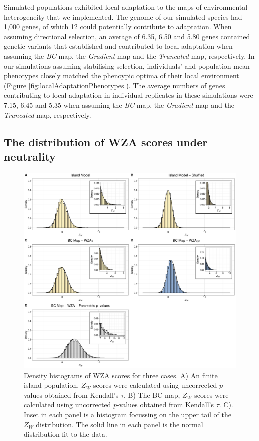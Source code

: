 \documentclass[10pt,twoside,lineno]{GSA_format}
\begin{document}
Simulated populations exhibited local adaptation to the maps of environmental heterogeneity that we implemented. The genome of our simulated species had 1,000 genes, of which 12 could potentially contribute to adaptation. When assuming directional selection, an average of 6.35, 6.50 and 5.80 genes contained genetic variants that established and contributed to local adaptation when assuming the \textit{BC} map, the \textit{Gradient} map and the \textit{Truncated} map, respectively. In our simulations assuming stabilising selection, individuals' and population mean phenotypes closely matched the phenoypic optima of their local environment (Figure \ref{fig:localAdaptationPhenotypes}). The average numbers of genes contributing to local adaptation in individual replicates in these simulations were 7.15, 6.45 and 5.35 when assuming the \textit{BC} map, the \textit{Gradient} map and the \textit{Truncated} map, respectively.\\

\subsection{The distribution of WZA scores under neutrality}

\begin{figure}
  \includegraphics[width=0.5\linewidth,keepaspectratio]{Plots/neutralResults_histogram.pdf} 

  \caption{Density histograms of WZA scores for three cases. A) An finite island population, $Z_W$ scores were calculated using uncorrected $p$-values obtained from Kendall's $\tau$. B)  The BC-map, $Z_W$ scores were calculated using uncorrected $p$-values obtained from Kendall's $\tau$. C). Inset in each panel is a histogram focussing on the upper tail of the $Z_W$ distribution. The solid line in each panel is the normal distribution fit to the data.}
  
  \label{fig:NeutralHistograms}
\end{figure}
\end{document}
